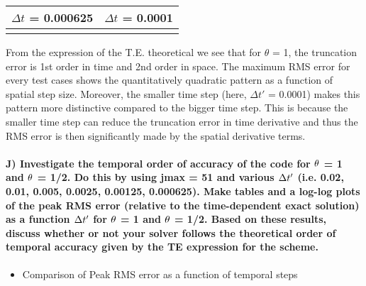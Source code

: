 \documentclass[letterpaper,10pt,english]{sphinxmanual}
\begin{document}
\begin{savenotes}\sphinxattablestart
\centering
\begin{tabulary}{\linewidth}[t]{|T|T|}
\hline

\(\Delta t\) = 0.000625
&
\(\Delta t\) = 0.0001
\\
\hline
\noindent{}
&
\noindent{}
\\
\hline
\end{tabulary}
\par
\sphinxattableend\end{savenotes}

From the expression of the T.E. theoretical we see that for \(\theta\) = 1, the truncation error is 1st order in time and 2nd order in space. The maximum RMS error for every test cases shows the quantitatively quadratic pattern as a function of spatial step size. Moreover, the smaller time step (here, \(\Delta t'\) = 0.0001) makes this pattern more distinctive compared to the bigger time step. This is because the smaller time step can reduce the truncation error in time derivative and thus the RMS error is then significantly made by the spatial derivative terms.


\paragraph{J) Investigate the temporal order of accuracy of the code for \protect\(\theta\protect\) = 1 and \protect\(\theta\protect\) = 1/2. Do this by using jmax = 51 and various \protect\(\Delta t'\protect\) (i.e. 0.02, 0.01, 0.005, 0.0025, 0.00125, 0.000625). Make tables and a log-log plots of the peak RMS error (relative to the time-dependent exact solution) as a function \protect\(\Delta t'\protect\) for \protect\(\theta\protect\) = 1 and \protect\(\theta\protect\) = 1/2. Based on these results, discuss whether or not your solver follows the theoretical order of temporal accuracy given by the TE expression for the scheme.}
\label{\detokenize{cases/results:j-investigate-the-temporal-order-of-accuracy-of-the-code-for-1-and-1-2-do-this-by-using-jmax-51-and-various-i-e-0-02-0-01-0-005-0-0025-0-00125-0-000625-make-tables-and-a-log-log-plots-of-the-peak-rms-error-relative-to-the-time-dependent-exact-solution-as-a-function-for-1-and-1-2-based-on-these-results-discuss-whether-or-not-your-solver-follows-the-theoretical-order-of-temporal-accuracy-given-by-the-te-expression-for-the-scheme}}\begin{itemize}
\item {} 
Comparison of Peak RMS error as a function of temporal steps

\end{itemize}
\end{document}
